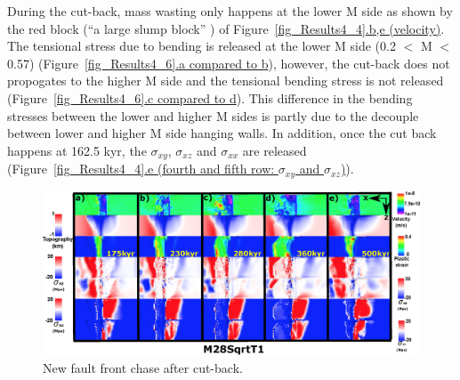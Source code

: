 During the cut-back, mass wasting only happens at the lower M side as shown by the red block (``a large slump block'' \citep{Smith2014}) of Figure~\hyperref[fig_Results4_4]{\ref{fig_Results4_4}.b,e (velocity)}. The tensional stress due to bending is released at the lower M side (0.2 $<$ M $<$ 0.57) (Figure~\hyperref[fig_Results4_6]{\ref{fig_Results4_6}.a compared to b}), however, the cut-back does not propogates to the higher M side and the tensional bending stress is not released (Figure~\hyperref[fig_Results4_6]{\ref{fig_Results4_6}.c compared to d}). This difference in the bending stresses between the lower and higher M sides is partly due to the decouple between lower and higher M side hanging walls. In addition, once the cut back happens at 162.5 kyr, the $\sigma_{xy}$, $\sigma_{xz}$ and $\sigma_{xx}$ are released (Figure~\hyperref[fig_Results4_4]{\ref{fig_Results4_4}.e (fourth and fifth row: $\sigma_{xy}$ and $\sigma_{xz}$)}). %

\begin{figure}[h]
  \centering
    \includegraphics[width=1.0\textwidth]{./Figures/fig_Results4_9_sqrt_cut_back_new_fault_chase.eps}
  \caption{New fault front chase after cut-back.}
 \label{fig_Results4_9}
\end{figure}

